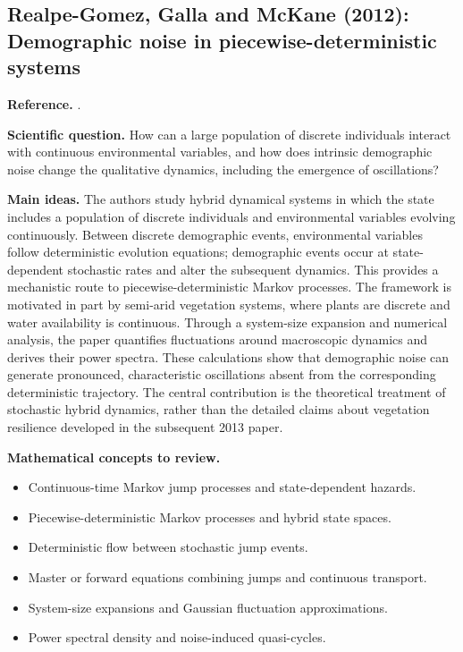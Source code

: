 \subsection{Realpe-Gomez, Galla and McKane (2012): Demographic noise in piecewise-deterministic systems}
\label{subsec:pdmp}
\noindent\textbf{Reference.} \citet{RealpeGomezGallaMcKane2012PDMP}.

\medskip\noindent\textbf{Scientific question.}
How can a large population of discrete individuals interact with continuous
environmental variables, and how does intrinsic demographic noise change the
qualitative dynamics, including the emergence of oscillations?

\medskip\noindent\textbf{Main ideas.}
The authors study hybrid dynamical systems in which the state includes a
population of discrete individuals and environmental variables evolving
continuously. Between discrete demographic events, environmental variables
follow deterministic evolution equations; demographic events occur at
state-dependent stochastic rates and alter the subsequent dynamics. This
provides a mechanistic route to piecewise-deterministic Markov processes.
The framework is motivated in part by semi-arid vegetation systems, where
plants are discrete and water availability is continuous. Through a
system-size expansion and numerical analysis, the paper quantifies
fluctuations around macroscopic dynamics and derives their power spectra.
These calculations show that demographic noise can generate pronounced,
characteristic oscillations absent from the corresponding deterministic
trajectory. The central contribution is the theoretical treatment of
stochastic hybrid dynamics, rather than the detailed claims about vegetation
resilience developed in the subsequent 2013 paper.

\medskip\noindent\textbf{Mathematical concepts to review.}
\begin{itemize}
  \item Continuous-time Markov jump processes and state-dependent hazards.
  \item Piecewise-deterministic Markov processes and hybrid state spaces.
  \item Deterministic flow between stochastic jump events.
  \item Master or forward equations combining jumps and continuous transport.
  \item System-size expansions and Gaussian fluctuation approximations.
  \item Power spectral density and noise-induced quasi-cycles.
\end{itemize}

